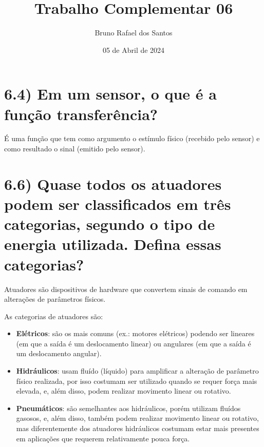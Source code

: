 \documentclass{article}
\title{Trabalho Complementar 06}
\author{Bruno Rafael dos Santos}
\date{05 de Abril de 2024}
\begin{document}
\maketitle

\section*{6.4) Em um sensor, o que é a função transferência?}
É uma função que tem como argumento o estímulo físico (recebido pelo sensor) e como resultado o sinal (emitido pelo sensor).


\section*{6.6) Quase todos os atuadores podem ser classificados em 
três categorias, segundo o tipo de energia utilizada. Defina essas categorias?}
Atuadores são dispositivos de hardware que convertem sinais de comando em alterações de parâmetros físicos.

As categorias de atuadores são:
    \begin{itemize}
        \item \textbf{Elétricos}: são os mais comuns (ex.: motores elétricos) podendo ser lineares (em que a saída é um deslocamento linear) ou angulares (em que a saída é um deslocamento angular).
        \item \textbf{Hidráulicos}: usam fluído (líquido) para amplificar a alteração de parâmetro físico realizada, por isso costumam ser utilizado quando se requer força mais elevada, e, além disso, podem realizar movimento linear ou rotativo.
        \item \textbf{Pneumáticos}: são semelhantes aos hidráulicos, porém utilizam fluídos gasosos, e, além disso, também podem realizar movimento linear ou rotativo, mas diferentemente dos atuadores hidráulicos costumam estar mais presentes em aplicações que requerem relativamente pouca força.
    \end{itemize}
\end{document}
